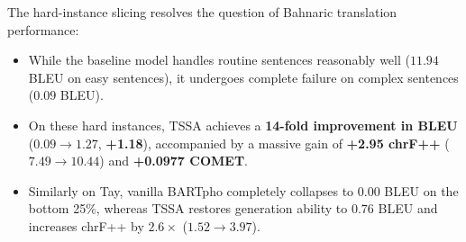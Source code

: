 \documentclass[11pt,a4paper]{article}
\begin{document}
\begin{table}[htbp]
\centering
\caption{\textbf{Hard-Instance vs. Easy-Instance Slicing (Bottom 25\% vs. Top 75\%).} Demonstrating dramatic capability gains on challenging translations where the baseline collapses.}
\label{tab:hard_instances}
\vspace{4pt}
\end{table}

The hard-instance slicing resolves the question of Bahnaric translation performance:
\begin{itemize}[leftmargin=*]
    \item While the baseline model handles routine sentences reasonably well ($11.94$ BLEU on easy sentences), it undergoes complete failure on complex sentences ($0.09$ BLEU).
    \item On these hard instances, TSSA achieves a \textbf{14-fold improvement in BLEU} ($0.09 \rightarrow 1.27$, \textbf{+1.18}), accompanied by a massive gain of \textbf{+2.95 chrF++} ($7.49 \rightarrow 10.44$) and \textbf{+0.0977 COMET}.
    \item Similarly on Tay, vanilla BARTpho completely collapses to $0.00$ BLEU on the bottom 25\%, whereas TSSA restores generation ability to $0.76$ BLEU and increases chrF++ by $2.6\times$ ($1.52 \rightarrow 3.97$).
\end{itemize}
\end{document}
